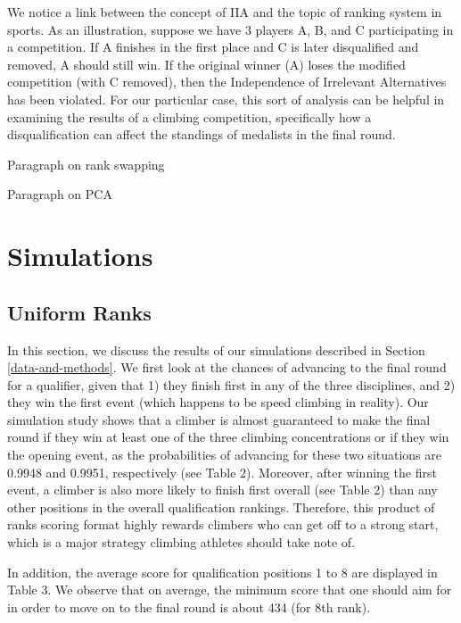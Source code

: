 \documentclass[12pt]{article}
\begin{document}
We notice a link between the concept of IIA and the topic of ranking
system in sports. As an illustration, suppose we have 3 players A, B,
and C participating in a competition. If A finishes in the first place
and C is later disqualified and removed, A should still win. If the
original winner (A) loses the modified competition (with C removed),
then the Independence of Irrelevant Alternatives has been violated. For
our particular case, this sort of analysis can be helpful in examining
the results of a climbing competition, specifically how a
disqualification can affect the standings of medalists in the final
round.

Paragraph on rank swapping

Paragraph on PCA

\hypertarget{simulations}{%
\section{Simulations}\label{simulations}}

\hypertarget{uniform-ranks}{%
\subsection{Uniform Ranks}\label{uniform-ranks}}

In this section, we discuss the results of our simulations described in
Section \ref{data-and-methods}. We first look at the chances of
advancing to the final round for a qualifier, given that 1) they finish
first in any of the three disciplines, and 2) they win the first event
(which happens to be speed climbing in reality). Our simulation study
shows that a climber is almost guaranteed to make the final round if
they win at least one of the three climbing concentrations or if they
win the opening event, as the probabilities of advancing for these two
situations are 0.9948 and 0.9951, respectively (see Table 2). Moreover,
after winning the first event, a climber is also more likely to finish
first overall (see Table 2) than any other positions in the overall
qualification rankings. Therefore, this product of ranks scoring format
highly rewards climbers who can get off to a strong start, which is a
major strategy climbing athletes should take note of.

In addition, the average score for qualification positions 1 to 8 are
displayed in Table 3. We observe that on average, the minimum score that
one should aim for in order to move on to the final round is about 434
(for 8th rank).
\end{document}

